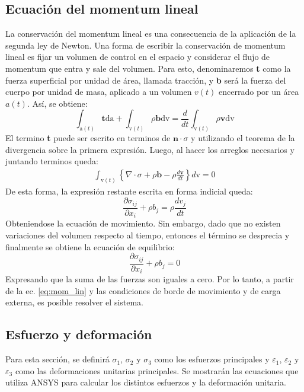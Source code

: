 \newpage

\subsection{Ecuación del momentum lineal}

La conservación del momentum lineal es una consecuencia de la aplicación de la segunda ley de Newton. Una forma de escribir la conservación de momentum lineal es fijar un volumen de control en el espacio y considerar el flujo de momentum que entra y sale del volumen. Para esto, denominaremos \textbf{t} como la fuerza superficial por unidad de área, llamada tracción, y \textbf{b} será la fuerza del cuerpo por unidad de masa, aplicado a un volumen $v(t)$ encerrado por un área $a(t)$. Así, se obtiene:
\begin{equation}
	\int_{\text{a}(t)} \mathbf{t} \text{da} + \int_{\text{v}(t)} \rho \mathbf{b} \text{dv} = \frac{d}{dt} \int_{\text{v}(t)} \rho \mathbf{v} \text{dv}
\end{equation}
El termino \textbf{t} puede ser escrito en terminos de $\mathbf{n}\cdot \sigma$ y utilizando el teorema de la divergencia sobre la primera expresión. Luego, al hacer los arreglos necesarios y juntando terminos queda:
\begin{gather*}
	\int_{\text{v}(t)} \left\lbrace \nabla \cdot \sigma + \rho\mathbf{b} - \rho \frac{d\mathbf{v}}{dt}\right\rbrace d\text{v} = 0
\end{gather*}
De esta forma, la expresión restante escrita en forma indicial queda:
\begin{equation}
	\frac{\partial \sigma_{ij}}{\partial x_i} + \rho b_j = \rho \frac{dv_j}{dt}
\end{equation}
Obteniendose la ecuación de movimiento. Sin embargo, dado que no existen variaciones del volumen respecto al tiempo, entonces el término se desprecia y finalmente se obtiene la ecuación de equilibrio:
\begin{equation}\label{eq:mom_lin}
	\frac{\partial \sigma_{ij}}{\partial x_i} + \rho b_j = 0
\end{equation}
Expresando que la suma de las fuerzas son iguales a cero. Por lo tanto, a partir de la ec. \ref{eq:mom_lin} y las condiciones de borde de movimiento y de carga externa, es posible resolver el sistema.

\newpage

\subsection{Esfuerzo y deformación}
Para esta sección, se definirá $\sigma_1$, $\sigma_2$ y $\sigma_3$ como los esfuerzos principales y $\varepsilon_1$, $\varepsilon_2$ y $\varepsilon_3$ como las deformaciones unitarias principales. Se mostrarán las ecuaciones que utiliza ANSYS para calcular los distintos esfuerzos y la deformación unitaria.
